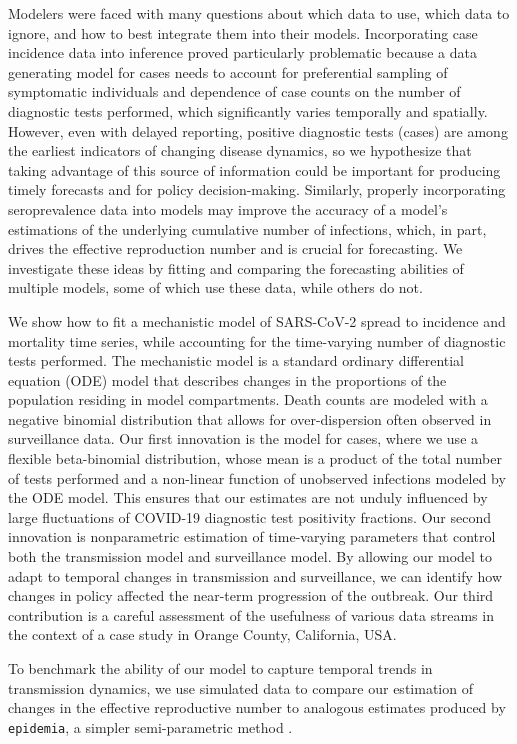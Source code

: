 Modelers were faced with many questions about which data to use, which data to ignore, and how to best integrate them into their models.
Incorporating case incidence data into inference proved particularly problematic because a data generating model for cases needs to account for preferential sampling of symptomatic individuals and dependence of case counts on the number of diagnostic tests performed, which significantly varies temporally and spatially.
However, even with delayed reporting, positive diagnostic tests (cases) are among the earliest indicators of changing disease dynamics, so we hypothesize that taking advantage of this source of information could be important for producing timely forecasts and for policy decision-making.
Similarly, properly incorporating seroprevalence data into models may improve the accuracy of a model's estimations of the underlying cumulative number of infections, which, in part, drives the effective reproduction number and is crucial for forecasting.
We investigate these ideas by fitting and comparing the forecasting abilities of multiple models, some of which use these data, while others do not.
\par
We show how to fit a mechanistic model of SARS-CoV-2 spread to incidence and mortality time series, while accounting for the time-varying number of diagnostic tests performed.
The mechanistic model is a standard ordinary differential equation (ODE) model that describes changes in the proportions of the population residing in model compartments.
Death counts are modeled with a negative binomial distribution that allows for over-dispersion often observed in surveillance data.
Our first innovation is the model for cases, where we use a flexible beta-binomial distribution, whose mean is a product of the total number of tests performed and a non-linear function of unobserved infections modeled by the ODE model.
This ensures that our estimates are not unduly influenced by large fluctuations of COVID-19 diagnostic test positivity fractions.
Our second innovation is nonparametric estimation of time-varying parameters that control both the transmission model and surveillance model.
By allowing our model to adapt to temporal changes in transmission and surveillance, we can identify how changes in policy affected the near-term progression of the outbreak.
Our third contribution is a careful assessment of the usefulness of various data streams in the context of a case study in Orange County, California, USA.
\par
To benchmark the ability of our model to capture temporal trends in transmission dynamics, we use simulated data to compare our estimation of changes in the effective reproductive number to analogous estimates produced by \texttt{epidemia}, a simpler semi-parametric method \citep{epidemia}.
